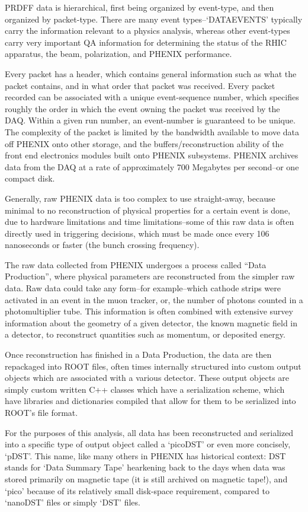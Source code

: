PRDFF data is hierarchical, first being organized by event-type, and
then organized by packet-type.  There are many event types--`DATAEVENTS'
typically carry the information relevant to a physics analysis, whereas other
event-types carry very important QA information for determining the status of
the RHIC apparatus, the beam, polarization, and PHENIX performance.

Every packet has a header, which contains general information such as what the
packet contains, and in what order that packet was received. Every packet
recorded can be associated with a unique event-sequence number, which specifies
roughly the order in which the event owning the packet was received by the DAQ.
Within a given run number, an event-number is guaranteed to be unique. The
complexity of the packet is limited by the bandwidth available to move data off
PHENIX onto other storage, and the buffers/reconstruction ability of the front
end electronics modules built onto PHENIX subsystems. PHENIX archives data from
the DAQ at a rate of approximately 700 Megabytes per second--or one compact
disk.

Generally, raw PHENIX data is too complex to use straight-away, because minimal
to no reconstruction of physical properties for a certain event is done, due to
hardware limitations and time limitations--some of this raw data is often
directly used in triggering decisions, which must be made once every 106
nanoseconds or faster (the bunch crossing frequency).

The raw data collected from PHENIX undergoes a process called ``Data Production'',
where physical parameters are reconstructed from the simpler raw data. Raw data
could take any form--for example--which cathode strips were activated in an
event in the muon tracker, or, the number of photons counted in a
photomultiplier tube. This information is often combined with extensive survey
information about the geometry of a given detector, the known magnetic field in
a detector, to reconstruct quantities such as momentum, or deposited energy.

Once reconstruction has finished in a Data Production, the data are then
repackaged into ROOT files, often times internally structured into custom output
objects which are associated with a various detector. These output objects are
simply custom written C++ classes which have a serialization scheme, which have
libraries and dictionaries compiled that allow for them to be serialized into
ROOT's file format.

For the purposes of this analysis, all data has been reconstructed and
serialized into a specific type of output object called a `picoDST' or even more
concisely, `pDST'. This name, like many others in PHENIX has historical context:
DST stands for `Data Summary Tape' hearkening back to the days when data was
stored primarily on magnetic tape (it is still archived on magnetic tape!), and
`pico' because of its relatively small disk-space requirement, compared to
`nanoDST' files or simply `DST' files. 

